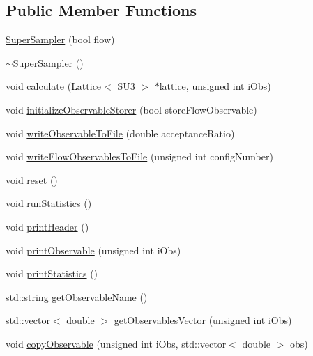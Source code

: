 \subsection*{Public Member Functions}
\begin{DoxyCompactItemize}
\item 
\mbox{\hyperlink{class_super_sampler_a6bf01b68f9befc5bf01c822e28c0c88d}{Super\+Sampler}} (bool flow)
\item 
\mbox{\hyperlink{class_super_sampler_a55e62dd765b7e85d629fb4ff07208d6d}{$\sim$\+Super\+Sampler}} ()
\item 
void \mbox{\hyperlink{class_super_sampler_a7e1457583270077c4fbcb288ea9b954c}{calculate}} (\mbox{\hyperlink{class_lattice}{Lattice}}$<$ \mbox{\hyperlink{class_s_u3}{S\+U3}} $>$ $\ast$lattice, unsigned int i\+Obs)
\item 
void \mbox{\hyperlink{class_super_sampler_a4429d6ae37247a02259bc0c6d665821c}{initialize\+Observable\+Storer}} (bool store\+Flow\+Observable)
\item 
void \mbox{\hyperlink{class_super_sampler_a05b42b82879233dc329d280a61bfd7f0}{write\+Observable\+To\+File}} (double acceptance\+Ratio)
\item 
void \mbox{\hyperlink{class_super_sampler_a410b650ebccdb03519c88908a3a8013e}{write\+Flow\+Observables\+To\+File}} (unsigned int config\+Number)
\item 
void \mbox{\hyperlink{class_super_sampler_ab2f028561e015500fac1e3093aa4a725}{reset}} ()
\item 
void \mbox{\hyperlink{class_super_sampler_af96f7d461e9159adb4eef9bda9c6ecde}{run\+Statistics}} ()
\item 
void \mbox{\hyperlink{class_super_sampler_a9bedfcc40a22c48378a6ed63f64e6957}{print\+Header}} ()
\item 
void \mbox{\hyperlink{class_super_sampler_adf92b9281ee9a782e6c00424dd23451d}{print\+Observable}} (unsigned int i\+Obs)
\item 
void \mbox{\hyperlink{class_super_sampler_a04b230314ae446c77172c97ff52cf4f3}{print\+Statistics}} ()
\item 
std\+::string \mbox{\hyperlink{class_super_sampler_a84d3ba9a56dd2a36cb11d495c32f5ca6}{get\+Observable\+Name}} ()
\item 
std\+::vector$<$ double $>$ \mbox{\hyperlink{class_super_sampler_a2b81588289576169c2148a88ddad482f}{get\+Observables\+Vector}} (unsigned int i\+Obs)
\item 
void \mbox{\hyperlink{class_super_sampler_a9f9155a519b2f60f029e92f641f54c9c}{copy\+Observable}} (unsigned int i\+Obs, std\+::vector$<$ double $>$ obs)
\end{DoxyCompactItemize}
